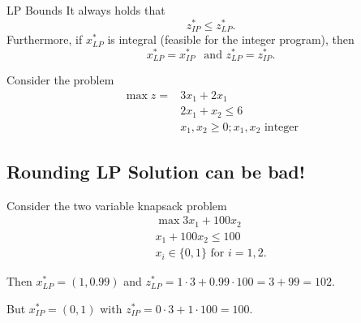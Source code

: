 \begin{theorem}{LP Bounds}{}
It always holds that 
\begin{equation}
z^*_{IP} \leq z^*_{LP}.
\end{equation}
Furthermore, if $x^*_{LP}$ is integral (feasible for the integer program), then 
\begin{equation}
x^*_{LP} = x^*_{IP} \ \ \text{ and } z^*_{LP} = z^*_{IP}.
\end{equation}
\end{theorem}

\begin{example}{}{}

%
\begin{minipage}[t]{0.5\textwidth}
Consider the problem 
\begin{align*}
\max z = & 3x_1 + 2x_1\\
& 2x_1 + x_2 \leq 6\\
& x_1, x_2 \geq 0; x_1, x_2 \text{ integer}
\end{align*}
\end{minipage}
%
\begin{minipage}[t]{0.4\textwidth}
\end{minipage}
\end{example}


  
  
  \subsection{Rounding LP Solution can be bad!}

  Consider the two variable knapsack problem
  \begin{align}
  \max   3x_1 + 100 x_2\\
              x_1  + 100 x_2 \leq 100\\
              x_i \in \{0,1\} \text{ for } i=1,2.
  \end{align}
  
  Then $x^*_{LP} = (1, 0.99)$ and $z^*_{LP} = 1\cdot 3 + 0.99\cdot 100 = 3 + 99 = 102.$
  
  But $x^*_{IP} = (0,1)$ with $z^*_{IP} = 0\cdot 3 + 1 \cdot 100 = 100$.
  
